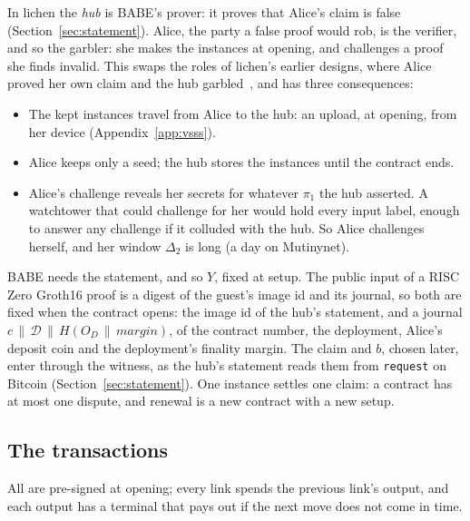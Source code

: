 \documentclass[11pt]{article}
\newcommand{\tx}[1]{\texttt{#1}}
\begin{document}
In lichen the \emph{hub} is BABE's prover: it proves that Alice's claim
is false (Section~\ref{sec:statement}). Alice, the party a false proof
would rob, is the verifier, and so the garbler: she makes the instances
at opening, and challenges a proof she finds invalid. This swaps the
roles of lichen's earlier designs, where Alice proved her own claim and
the hub garbled~\cite{lichenbuilt}, and has three consequences:
\begin{itemize}[leftmargin=1.5em]
\item The kept instances travel from Alice to the hub: an upload, at
  opening, from her device (Appendix~\ref{app:vsss}).
\item Alice keeps only a seed; the hub stores the instances until the
  contract ends.
\item Alice's challenge reveals her secrets for whatever $\pi_1$ the hub
  asserted. A watchtower that could challenge for her would hold every
  input label, enough to answer any challenge if it colluded with the
  hub. So Alice challenges herself, and her window $\Delta_2$ is long (a
  day on Mutinynet).
\end{itemize}

BABE needs the statement, and so $Y$, fixed at setup. The public input of
a RISC Zero Groth16 proof is a digest of the guest's image id and its
journal, so both are fixed when the contract opens: the image id of the
hub's statement, and a journal $c \,\|\, \mathcal{D} \,\|\,
H(O_D \,\|\, \mathit{margin})$, of the contract number, the deployment,
Alice's deposit coin and the deployment's finality margin. The claim and
$b$, chosen later, enter through the witness, as the hub's statement
reads them from \tx{request} on Bitcoin
(Section~\ref{sec:statement}). One instance settles one claim: a contract
has at most one dispute, and renewal is a new contract with a new setup.

\subsection{The transactions}

All are pre-signed at opening; every link spends the previous link's
output, and each output has a terminal that pays out if the next move
does not come in time.
\end{document}
